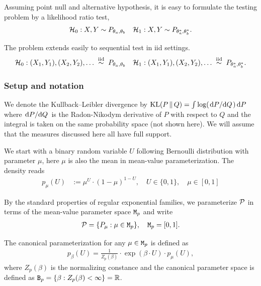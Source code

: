 Assuming point null and alternative hypothesis,
it is easy to formulate the testing problem by a likelihood ratio test,
\begin{align*}
	\Hc_0: X,Y \sim P_{\theta_a,\theta_b} \quad
	\Hc_1: X,Y \sim P_{\theta_a^*,\theta_b^*}.
\end{align*}

The problem extends easily to sequential test in iid settings.
\begin{align*}
	\Hc_0: (X_1,Y_1),(X_2,Y_2),\dots \iid P_{\theta_a,\theta_b} \quad
	\Hc_1: (X_1,Y_1),(X_2,Y_2),\dots \iid P_{\theta_a^*,\theta_b^*}.
\end{align*}


\subsubsection{Setup and notation}

We denote the Kullback–Leibler divergence by ${\mathrm{KL}}({P} \,\Vert\, {Q}) = \int \log(\dv*{P}{Q}) \dd{P}$
where $\dv*{P}{Q}$ is the Radon-Nikodym derivative of $P$ with respect to $Q$ and
the integral is taken on the same probability space (not shown here).
We will assume that the measures discussed here all have full support.

We start with a binary random variable $U$
following Bernoulli distribution with parameter $\mu$,
here $\mu$ is also the mean in mean-value parameterization.
The density reads
\begin{align*}
	p_{\mu}(U)
	 & := \mu^U \cdot (1 - \mu)^{1-U}, \quad U \in \{0,1\}, \quad \mu \in [0,1]
\end{align*}

By the standard properties of regular exponential families,
we parameterize $\mathcal{P}$ in terms of the mean-value parameter space $\mathtt{M}_p$ and write
\begin{align*}
	\Pc = \{P_\mu: \mu \in \Mt_p\}, \quad \Mt_p = [0,1].
\end{align*}

The canonical parameterization for any $\mu \in \mathtt{M}_p$ is defined as
\begin{align*} 
	p_{\beta}(U) = \frac{1}{Z_p(\beta)} \cdot \exp(\beta \cdot U) \cdot p_{\mu}(U), 
\end{align*}\label{eq:bern_exp}
where $Z_p(\beta)$ is the normalizing constance and the canonical parameter space is
defined as $\mathtt{B}_p = \{\beta: Z_p(\beta) < \infty \} = \mathbb{R}$.

